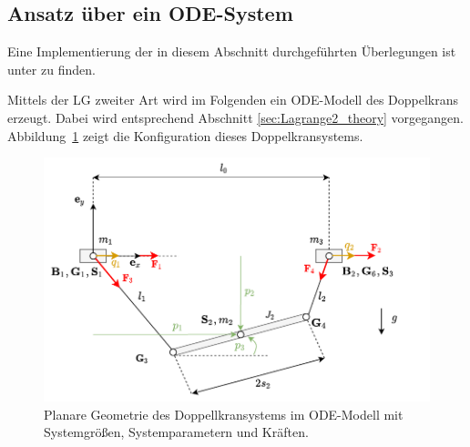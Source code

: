 \subsection{Ansatz über ein ODE-System}
\label{subsec:double_crane_lagrange2}
Eine Implementierung der in diesem Abschnitt durchgeführten Überlegungen ist unter \cite[flatness\_notebooks/ODE\_flatness\_analysis.ipynb]{SAGithub} zu finden.

Mittels der LG zweiter Art wird im Folgenden ein ODE-Modell des Doppelkrans erzeugt. Dabei wird entsprechend Abschnitt \ref{sec:Lagrange2_theory} vorgegangen. Abbildung~\ref{fig:double_crane_diagram} zeigt die Konfiguration dieses Doppelkransystems.

\begin{figure}[ht]
	\begin{center}
		\includegraphics[scale=1]{Pictures/ODE_flatness_analysis_double_crane_diagram}
	\end{center}
	\caption[Planare Geometrie des Doppellkransystems im ODE-Modell]
	{Planare Geometrie des Doppellkransystems im ODE-Modell mit Systemgrößen, Systemparametern und Kräften.}
	\label{fig:double_crane_diagram}
\end{figure}


